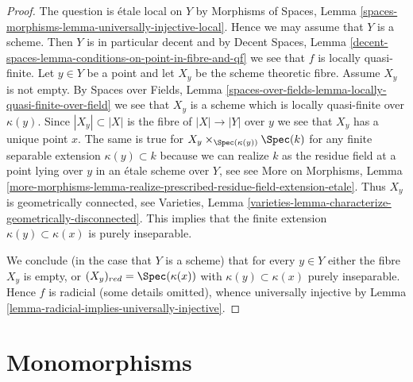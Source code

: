 \begin{proof}
The question is \'etale local on $Y$ by
Morphisms of Spaces, Lemma
\ref{spaces-morphisms-lemma-universally-injective-local}.
Hence we may assume that $Y$ is a scheme.
Then $Y$ is in particular decent and by Decent Spaces, Lemma
\ref{decent-spaces-lemma-conditions-on-point-in-fibre-and-qf}
we see that $f$ is locally quasi-finite.
Let $y \in Y$ be a point and let $X_y$ be the scheme theoretic
fibre. Assume $X_y$ is not empty. By Spaces over Fields, Lemma
\ref{spaces-over-fields-lemma-locally-quasi-finite-over-field}
we see that $X_y$ is a scheme which is locally quasi-finite over
$\kappa(y)$. Since $|X_y| \subset |X|$ is the fibre of $|X| \to |Y|$
over $y$ we see that $X_y$ has a unique point $x$. The same is true
for $X_y \times_{\Spec(\kappa(y))} \Spec(k)$ for any
finite separable extension $\kappa(y) \subset k$
because we can realize $k$ as the residue field at a point
lying over $y$ in an \'etale scheme over $Y$, see
see More on Morphisms, Lemma
\ref{more-morphisms-lemma-realize-prescribed-residue-field-extension-etale}.
Thus $X_y$ is geometrically connected, see
Varieties, Lemma \ref{varieties-lemma-characterize-geometrically-disconnected}.
This implies that the finite extension $\kappa(y) \subset \kappa(x)$
is purely inseparable.

\medskip\noindent
We conclude (in the case that $Y$ is a scheme)
that for every $y \in Y$ either the fibre $X_y$ is empty,
or $(X_y)_{red} = \Spec(\kappa(x))$ with
$\kappa(y) \subset \kappa(x)$ purely inseparable.
Hence $f$ is radicial (some details omitted), whence universally injective by
Lemma \ref{lemma-radicial-implies-universally-injective}.
\end{proof}




\section{Monomorphisms}
\label{section-monomorphisms}

